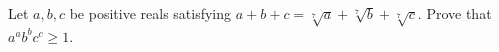 Let $a,b,c$ be positive reals satisfying $a+b+c = \sqrt[7]{a} + \sqrt[7]{b} + \sqrt[7]{c}$.  Prove that $a^a b^b c^c \ge 1$.

